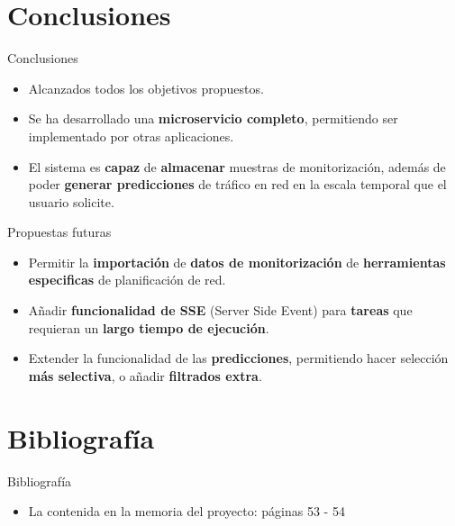 \documentclass[aspectratio=169,xcolor=dvipsnames]{beamer}
\begin{document}
	
	\section{Conclusiones}
	
	\begin{frame}{Conclusiones}
		\begin{itemize}
			\item Alcanzados todos los objetivos propuestos.
			
			\item Se ha desarrollado una \textbf{microservicio completo}, permitiendo ser implementado por otras aplicaciones.
			
			\item El sistema es \textbf{capaz} de \textbf{almacenar} muestras de monitorización, además de poder \textbf{generar predicciones} de tráfico en red en la escala temporal que el usuario solicite.
		\end{itemize}
	
		\begin{exampleblock}{Propuestas futuras}
			\begin{itemize}
				\item Permitir la \textbf{importación} de \textbf{datos de monitorización} de \textbf{herramientas especificas} de planificación de red.
				
				\item Añadir \textbf{funcionalidad de SSE} (Server Side Event) para \textbf{tareas} que requieran un \textbf{largo tiempo de ejecución}.
				
				\item Extender la funcionalidad de las \textbf{predicciones}, permitiendo hacer selección \textbf{más selectiva}, o añadir \textbf{filtrados extra}.
			\end{itemize}
		\end{exampleblock}
	\end{frame}
	
	
	\section{Bibliografía}
	
	\begin{frame}{Bibliografía}
		\begin{itemize}
		    \item La contenida en la memoria del proyecto: páginas 53 - 54
		\end{itemize}
	\end{frame}
	
\end{document}
